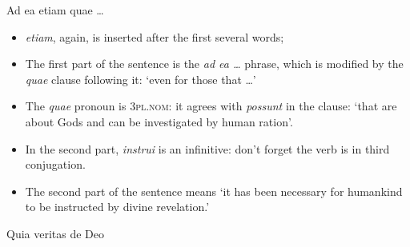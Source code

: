 \documentclass[a4paper, 12pt]{article}
\newcommand{\form}[1]{\emph{#1}}
\newcommand*{\category}[1]{\textsc{#1}}
\newcommand{\translate}[1]{`#1'}
\begin{document}
\begin{exe}
    \ex Ad ea etiam quae \dots
\end{exe}

\begin{itemize}
    \item \emph{etiam}, again, is inserted after the first several words;  
    \item The first part of the sentence is the \form{ad ea \dots} phrase,
    which is modified by the \form{quae} clause following it:
    \translate{even for those that \dots}
    \item The \form{quae} pronoun is \category{3pl.nom}: 
    it agrees with \form{possunt} in the clause: 
    \translate{that are about Gods and can be investigated by human ration}.
    \item In the second part, \form{instrui} is an infinitive: 
    don't forget the verb is in third conjugation.
    \item The second part of the sentence means 
    \translate{it has been necessary for humankind to be instructed by divine revelation.}
\end{itemize}

\begin{exe}
    \ex Quia veritas de Deo 
\end{exe}
\end{document}
